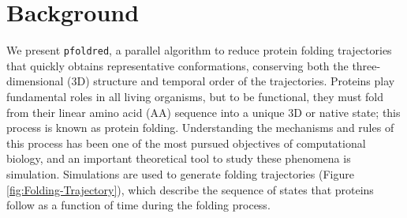 \documentclass[twocolumn]{bmcart}%
\begin{document}


\section*{Background}


%

We present \texttt{pfoldred}, a parallel algorithm to reduce protein folding trajectories that quickly obtains representative conformations, conserving both the three-dimensional (3D) structure and temporal order of the trajectories. Proteins play fundamental roles in all living organisms, but to be functional, they must fold from their linear amino acid (AA) sequence into a unique 3D or native state; this process is known as protein folding. Understanding the mechanisms and rules of this process has been one of the most pursued objectives of computational biology, and an important theoretical tool to study these phenomena is simulation. Simulations are used to generate folding trajectories (Figure \ref{fig:Folding-Trajectory}), which describe the sequence of states that proteins follow as a function of time during the folding process.
\end{document}
